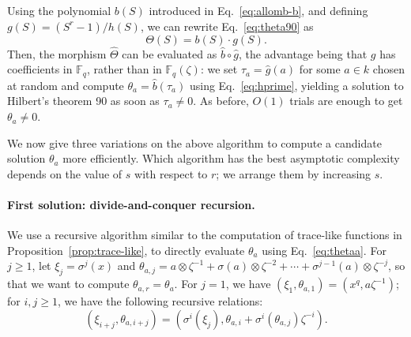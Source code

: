 \documentclass{mcom-l}
\theoremstyle{plain}
\theoremstyle{definition}
\newcommand{\F}{\ensuremath{\mathbb{F}}}
\newcounter{algorithm}
\begin{document}
Using the polynomial $b(S)$ introduced in Eq.~\eqref{eq:allomb-b},
and defining
$g(S)=(S^r-1)/h(S)$, we can rewrite Eq.~\eqref{eq:theta90} as
\begin{equation}
  \label{eq:theta90bis}
  \Theta(S) = b(S) \cdot g(S).
\end{equation}
Then, the morphism $\hat\Theta$ can be evaluated
as $\hat{b}\circ\hat{g}$, the advantage being that $g$ has
coefficients in $\F_q$, rather than in $\F_q(\zeta)$: we set $\tau_a = \hat{g}(a)$ for some $a\in k$ chosen at random
and compute $\theta_a = \hat{b}(\tau_a)$ using Eq.~\eqref{eq:hprime},
yielding a solution to Hilbert's theorem 90 as soon as $\tau_a \neq 0$.
As before, $O(1)$ trials are enough to get $\theta_a \neq 0$.



We now give three variations on the above algorithm to compute 
a candidate solution $\theta_a$ more efficiently.
Which algorithm has the best asymptotic complexity depends on the
value of $s$ with respect to $r$; we arrange them by increasing $s$.



\paragraph{\bf First solution: divide-and-conquer recursion.}
We use a recursive algorithm similar to the computation of trace-like
functions in Proposition~\ref{prop:trace-like}, to directly evaluate
$\theta_a$ using Eq.~\eqref{eq:thetaa}. For $j \ge 1$, let
$\xi_j=\sigma^j(x)$ and $\theta_{a,j} = a\otimes\zeta^{-1} +
\sigma(a)\otimes\zeta^{-2} + \cdots +
\sigma^{j-1}(a)\otimes\zeta^{-j}$, so that we want to compute
$\theta_{a,r}=\theta_a$. For $j=1$, we have $(\xi_1,\theta_{a,1})=
(x^q, a\zeta^{-1})$; for $i,j \ge 1$, we have the following
recursive relations:
\begin{equation}
\label{eq:theta-recursive}
(\xi_{i+j}, \theta_{a, i+j}) = (\sigma^i(\xi_j), \theta_{a,i} + \sigma^i(\theta_{a,j})\zeta^{-i}).
\end{equation}
\end{document}
